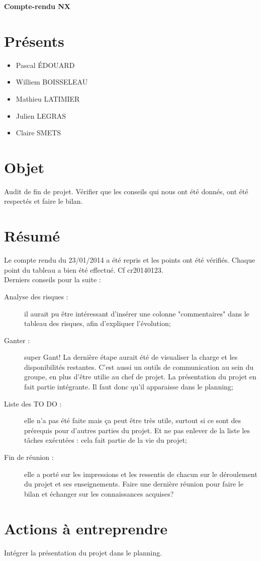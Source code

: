 \documentclass[a4paper,11pt,french]{article}
\author{\hmwkAuthorName}
\date{21/02/2013} %
\newcommand{\hmwkDocName}{Compte-rendu N\degree X} %
\begin{document}
\pagestyle{fancy}

\begin{center}\textbf{\Huge{\hmwkDocName}}\end{center}
	
\section{Présents}
\begin{itemize}
	\item Pascal ÉDOUARD
	\item Williem BOISSELEAU
	\item Mathieu LATIMIER
	\item Julien LEGRAS
	\item Claire SMETS
\end{itemize}

\section{Objet}
Audit de fin de projet. Vérifier que les conseils qui nous ont été donnés, ont été respectés et faire le bilan.

\section{Résumé}

Le compte rendu du 23/01/2014 a été repris et les points ont été vérifiés. Chaque point du tableau a bien été effectué. Cf cr20140123.\\
Derniers conseils pour la suite : 
\begin{description}
	\item [Analyse des risques : ] il aurait pu être intéressant d'insérer une colonne "commentaires" dans le tableau des risques, afin d'expliquer l'évolution;
	\item [Ganter : ] super Gant! La dernière étape aurait été de visualiser la charge et les disponibilités restantes. C'est aussi un outils de communication au sein du groupe, en plus d'être utilie au chef de projet. La présentation du projet en fait partie intégrante. Il faut donc qu'il apparaisse dans le planning;
	\item [Liste des TO DO : ] elle n'a pas été faite mais ça peut être très utile, surtout si ce sont des prérequis pour d'autres parties du projet. Et ne pas enlever de la liste les tâches exécutées : cela fait partie de la vie du projet;
	\item [Fin de réunion : ] elle a porté sur les impressions et les ressentis de chacun sur le déroulement du projet et ses enseignements. Faire une dernière réunion pour faire le bilan et échanger sur les connaissances acquises?\\
\end{description}

\section{Actions à entreprendre}
Intégrer la présentation du projet dans le planning.
\end{document}
